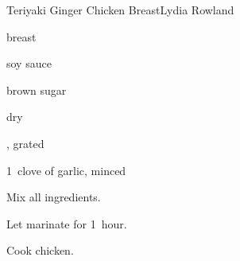 \begin{recipe}{Teriyaki Ginger Chicken Breast}{Lydia Rowland}{}

\begin{ingredients}
\item {}  breast
\item {} soy sauce
\item {} brown sugar
\item {} dry 
\item \tp{\half} , grated 
\item 1~clove of garlic, minced 
\end{ingredients}

\begin{directions}
\item Mix all ingredients.
\item Let marinate for 1~hour.
\item Cook chicken.
\end{directions}

\end{recipe}

